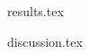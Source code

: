 \documentclass[a4paper,11pt,twoside]{report}
\begin{document}

{results.tex}




{discussion.tex}




\end{document}

